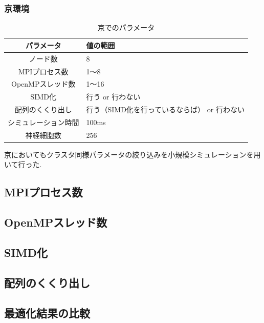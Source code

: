 \clearpage
\subsubsection{京環境}
\begin{table}[htb]
  \caption {京でのパラメータ}
  \begin{center}
    \begin{tabular}{|c|p{12cm}|}
      \hline
      パラメータ & 値の範囲\\ \hline
      ノード数 & 8\\ \hline
      MPIプロセス数 & 1〜8\\ \hline
      OpenMPスレッド数 & 1〜16\\ \hline
      SIMD化 & 行う or 行わない\\ \hline
      配列のくくり出し & 行う（SIMD化を行っているならば） or 行わない\\ \hline
      シミュレーション時間 & 100ms\\ \hline
      神経細胞数 & 256\\ \hline
    \end{tabular}
  \end{center}
\end{table}
京においてもクラスタ同様パラメータの絞り込みを小規模シミュレーションを用いて行った.\\


\subsection{MPIプロセス数}

\subsection{OpenMPスレッド数}

\subsection{SIMD化}

\subsection{配列のくくり出し}

\subsection{最適化結果の比較}
